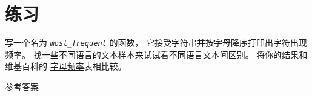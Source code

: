 
\section{练习}

\begin{exercise}

写一个名为 {\em \lstinline{most_frequent}} 的函数，
它接受字符串并按字母降序打印出字符出现频率。
找一些不同语言的文本样本来试试看不同语言文本间区别。
将你的结果和维基百科的
\href{http://en.wikipedia.org/wiki/Letter_frequencies}{字母频率}表相比较。

\href{http://thinkpython2.com/code/most_frequent.py}{参考答案}

 
 

\end{exercise}


